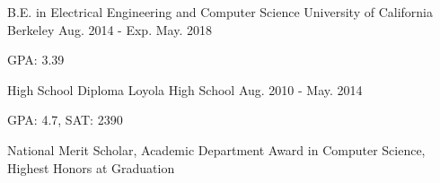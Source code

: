 \vspace{-6mm}
\vspace{-2mm}

\begin{cventries}

  \cventry
    {B.E. in Electrical Engineering and Computer Science} %
    {University of California Berkeley} %
    {Aug. 2014 - Exp. May. 2018} %
    {} %
    {
      \begin{cvitems} %
        \item GPA: 3.39
      \end{cvitems}
    }
      \cventry
    {High School Diploma} %
    {Loyola High School} %
    {Aug. 2010 -  May. 2014} %
    {} %
    {
      \begin{cvitems} %
        \item GPA: 4.7, SAT: 2390
        \item National Merit Scholar, Academic Department Award in Computer Science, Highest Honors at Graduation
      \end{cvitems}
    }

\end{cventries}
